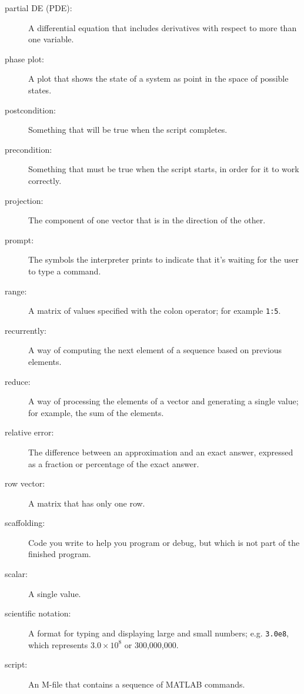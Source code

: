 \begin{description}
\item[partial DE (PDE):] A differential equation that includes derivatives with respect to more than one variable.

\item[phase plot:] A plot that shows the state of a system as point
in the space of possible states.

\item[postcondition:] Something that will be true when the script
completes.

\item[precondition:] Something that must be true when the script
starts, in order for it to work correctly.

\item[projection:] The component of one vector that is in the
direction of the other.

\item[prompt:] The symbols the interpreter prints to indicate that it's
waiting for the user to type a command.

\item[range:] A matrix of values specified with the colon operator; for example {\tt 1:5}.

\item[recurrently:] A way of computing the next element of a sequence
based on previous elements.

\item[reduce:] A way of processing the elements of a vector and
generating a single value; for example, the sum of the elements.

\item[relative error:] The difference between an approximation and
an exact answer, expressed as a fraction or percentage of the exact
answer.

\item[row vector:] A matrix that has only one row.

\item[scaffolding:] Code you write to help you program or debug, but
which is not part of the finished program.

\item[scalar:] A single value.

\item[scientific notation:] A format for typing and displaying large
and small numbers; e.g. {\tt 3.0e8}, which represents $3.0 \times 10^8$
or 300,000,000.

\item[script:] An M-file that contains a sequence of MATLAB commands.


\end{description}
